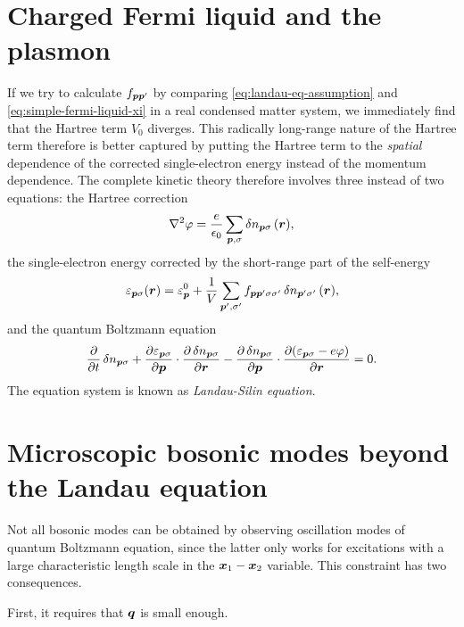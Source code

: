 \documentclass[hyperref, a4paper]{article}
\begin{document}
\section{Charged Fermi liquid and the plasmon}\label{sec:charged-fermi-liquid}

If we try to calculate $f_{\vb*{p} \vb*{p}'}$ by 
comparing \eqref{eq:landau-eq-assumption} and \eqref{eq:simple-fermi-liquid-xi}
in a real condensed matter system,
we immediately find that the Hartree term $V_0$ diverges.
This radically long-range nature of the Hartree term therefore 
is better captured by 
putting the Hartree term to the 
\emph{spatial} dependence of the corrected single-electron energy 
instead of the momentum dependence.
The complete kinetic theory therefore involves three instead of two equations:
the Hartree correction
\begin{equation}
    \laplacian \varphi = \frac{e}{\epsilon_0} \sum_{\vb*{p}, \sigma} \var{n}_{\vb*{p} \sigma}(\vb*{r}),
\end{equation}
the single-electron energy corrected by 
the short-range part of the self-energy
\begin{equation}
    \varepsilon_{\vb*{p} \sigma}(\vb*{r}) = \varepsilon^0_{\vb*{p}} 
        + \frac{1}{V} \sum_{\vb*{p}', \sigma'} 
        f_{\vb*{p} \vb*{p}' \sigma \sigma'} \var{n}_{\vb*{p}' \sigma'}(\vb*{r}),
\end{equation}
and the quantum Boltzmann equation 
\begin{equation}
    \pdv{t} \var{n}_{\vb*{p} \sigma} 
    + \pdv{\varepsilon_{\vb*{p} \sigma}}{\vb*{p}} \cdot \pdv{\var{n}_{\vb*{p} \sigma}}{\vb*{r}}
    - \pdv{\var{n}_{\vb*{p} \sigma}}{\vb*{p}} \cdot \pdv{(\varepsilon_{\vb*{p} \sigma} - e \varphi)}{\vb*{r}} = 0.
\end{equation}
The equation system is known as \emph{Landau-Silin equation}.

\section{Microscopic bosonic modes beyond the Landau equation}\label{sec:microscopic-bosonic-modes}

Not all bosonic modes can be obtained 
by observing oscillation modes of quantum Boltzmann equation,
since the latter only works for 
excitations with a large characteristic length scale 
in the $\vb*{x}_1 - \vb*{x}_2$ variable.
This constraint has two consequences.

First, it requires that $\vb*{q}$ is small enough.
\end{document}

